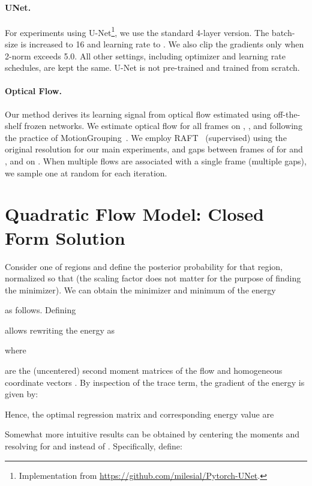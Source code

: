 \paragraph{UNet.} For experiments using U-Net\footnote{Implementation from \url{https://github.com/milesial/Pytorch-UNet}.}, we use the standard 4-layer version. The batch-size is increased to 16 and learning rate to . We also clip the gradients only when 2-norm exceeds 5.0. All other settings, including optimizer and learning rate schedules, are kept the same. U-Net is not pre-trained and trained from scratch.  

\paragraph{Optical Flow.}
Our method derives its learning signal from optical flow estimated using off-the-shelf frozen networks.
We estimate optical flow for all frames on \DAVIS, \ST, and \FBMS following the practice of MotionGrouping~\cite{yang2021self-supervised}.
We employ RAFT~\cite{teed2020raft} (supervised) using the original resolution for our main experiments, and gaps between frames of  for \DAVIS and \ST, and  on \FBMS{}\@. When multiple flows are associated with a single frame (multiple gaps), we sample one at random for each iteration.


\section{Quadratic Flow Model: Closed Form Solution} \label{sup:sec2}

\newcommand{\USigma}{\Lambda}

Consider one of  regions  and define  the posterior probability for that region, normalized so that  (the scaling factor does not matter for the purpose of finding the minimizer).
We can obtain the minimizer  and minimum of the energy

as follows.
Defining

allows rewriting the energy as

where

are the (uncentered) second moment matrices of the flow  and homogeneous coordinate vectors .
By inspection of the trace term, the gradient of the energy is given by:

Hence, the optimal regression matrix  and corresponding energy value are


Somewhat more intuitive results can be obtained by centering the moments and resolving for  and  instead of .
Specifically, define:

